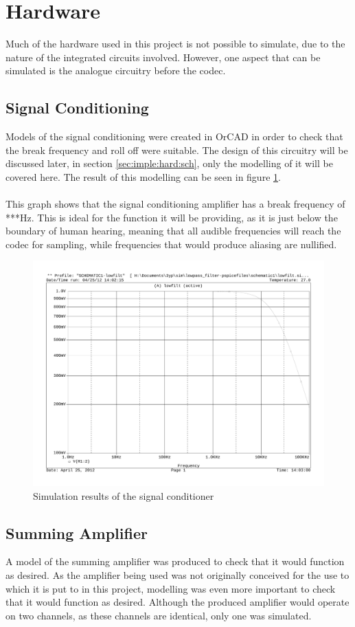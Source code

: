 \section{Hardware}
Much of the hardware used in this project is not possible to simulate, due to
the nature of the integrated circuits involved.
However, one aspect that can be simulated is the analogue circuitry before the
codec.

\subsection{Signal Conditioning}
Models of the signal conditioning were created in OrCAD in order to check that
the break frequency and roll off were suitable.
The design of this circuitry will be discussed later, in section
\ref{sec:imple:hard:sch}, only the modelling of it will be covered here.
The result of this modelling can be seen in figure \ref{fig:sigcondmodel}.
\\
\\
This graph shows that the signal conditioning amplifier has a break frequency
of ***Hz.
This is ideal for the function it will be providing, as it is just below the
boundary of human hearing, meaning that all audible frequencies will reach 
the codec for sampling, while frequencies that would produce aliasing are
nullified.

\begin{figure}[H]
	\centering
	\includegraphics[width=\textwidth]{./img/signal_conditioning_sim.pdf}
	\caption{Simulation results of the signal conditioner}
	\label{fig:sigcondmodel}
\end{figure}

\subsection{Summing Amplifier}
A model of the summing amplifier was produced to check that it would function
as desired.
As the amplifier being used was not originally conceived for the use to which
it is put to in this project, modelling was even more important to check that
it would function as desired.
Although the produced amplifier would operate on two channels, as these channels
are identical, only one was simulated.

